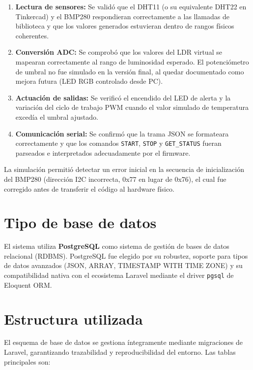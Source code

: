 \begin{enumerate}[leftmargin=*]
    \item \textbf{Lectura de sensores:} Se validó que el DHT11 (o su equivalente DHT22 en Tinkercad) y el BMP280 respondieran correctamente a las llamadas de biblioteca y que los valores generados estuvieran dentro de rangos físicos coherentes.
    \item \textbf{Conversión ADC:} Se comprobó que los valores del LDR virtual se mapearan correctamente al rango de luminosidad esperado. El potenciómetro de umbral no fue simulado en la versión final, al quedar documentado como mejora futura (LED RGB controlado desde PC).
    \item \textbf{Actuación de salidas:} Se verificó el encendido del LED de alerta y la variación del ciclo de trabajo PWM cuando el valor simulado de temperatura excedía el umbral ajustado.
    \item \textbf{Comunicación serial:} Se confirmó que la trama JSON se formateara correctamente y que los comandos \texttt{START}, \texttt{STOP} y \texttt{GET\_STATUS} fueran parseados e interpretados adecuadamente por el firmware.
\end{enumerate}

La simulación permitió detectar un error inicial en la secuencia de inicialización del BMP280 (dirección I2C incorrecta, 0x77 en lugar de 0x76), el cual fue corregido antes de transferir el código al hardware físico.

\label{ch:base-datos}

\section{Tipo de base de datos}

El sistema utiliza \textbf{PostgreSQL} como sistema de gestión de bases de datos relacional (RDBMS). PostgreSQL fue elegido por su robustez, soporte para tipos de datos avanzados (JSON, ARRAY, TIMESTAMP WITH TIME ZONE) y su compatibilidad nativa con el ecosistema Laravel mediante el driver \texttt{pgsql} de Eloquent ORM.

\section{Estructura utilizada}

El esquema de base de datos se gestiona íntegramente mediante migraciones de Laravel, garantizando trazabilidad y reproducibilidad del entorno. Las tablas principales son:

